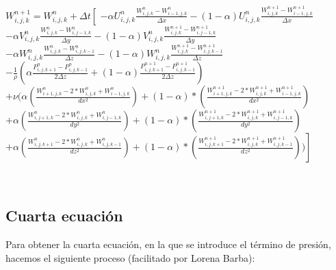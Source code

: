 \documentclass[a4paper]{article}
\begin{document}
\begin{enumerate}
$ W^{n+1}_{i,j,k} =  W^{n}_{i,j,k} +  \Delta t \left[ \right.$
$- \alpha {U}^{n}_{i,j,k} \frac{ {W}^{n}_{i,j,k} - W^{n}_{i-1,j,k}}{\Delta x} - (1 - \alpha) {U}^{n}_{i,j,k} \frac{ {W}^{n+1}_{i,j,k} - W^{n+1}_{i-1,j,k}}{ \Delta x}$ 
\\
$- \alpha {V}^{n}_{i,j,k} \frac{ {W}^{n}_{i,j,k} - W^{n}_{i,j-1,k}}{ \Delta y} - (1 - \alpha) {V}^{n}_{i,j,k} \frac{ {W}^{n+1}_{i,j,k} - W^{n+1}_{i,j-1,k}}{ \Delta y}$
\\
$- \alpha {W}^{n}_{i,j,k} \frac{ {W}^{n}_{i,j,k} - W^{n}_{i,j,k-1}}{ \Delta z} - (1 - \alpha) {W}^{n}_{i,j,k} \frac{ {W}^{n+1}_{i,j,k} - W^{n+1}_{i,j,k-1}}{ \Delta z}$
\\
$- \frac{1}{\rho} ( \alpha \frac{P^{n}_{i,j,k+1} - P^{n}_{i,j,k-1} }{ 2 \Delta z } + (1 - \alpha) \frac{P^{n+1}_{i,j,k+1} - P^{n+1}_{i,j,k-1} }{ 2 \Delta z })  $
\\
$+ \nu (\alpha (\frac{ W^{n}_{i+1,j,k} - 2*W^{n}_{i,j,k} + W^{n}_{i-1,j,k}}{dx^2}) + (1-\alpha)*(\frac{ W^{n+1}_{i+1,j,k} - 2*W^{n+1}_{i,j,k} + W^{n+1}_{i-1,j,k}}{dx^2})$
\\
$+ \alpha (\frac{ W^{n}_{i,j+1,k} - 2*W^{n}_{i,j,k} + W^{n}_{i,j-1,k}}{dy^2}) + (1-\alpha)*(\frac{ W^{n+1}_{i,j+1,k} - 2*W^{n+1}_{i,j,k} + W^{n+1}_{i,j-1,k}}{dy^2})$
\\
$\left. + \alpha (\frac{ W^{n}_{i,j,k+1} - 2*W^{n}_{i,j,k} + W^{n}_{i,j,k-1}}{dz^2}) + (1-\alpha)*(\frac{ W^{n+1}_{i,j,k+1} - 2*W^{n+1}_{i,j,k} + W^{n+1}_{i,j,k-1}}{dz^2}) )\right]$

~\\

\end{enumerate}


\subsection{Cuarta ecuación}

Para obtener la cuarta ecuación, en la que se introduce el término de presión, hacemos el siguiente proceso (facilitado por Lorena Barba):
\end{document}

